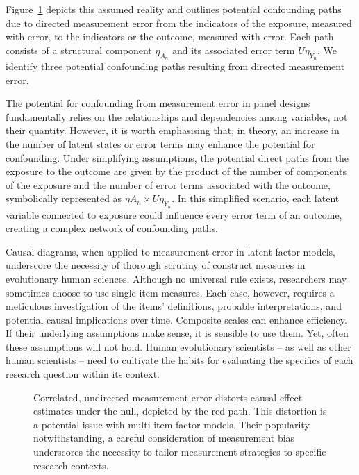 \documentclass[
  singlecolumn]{article}
\begin{document}
Figure~\ref{fig-dag-coarsen-measurement-error} depicts this assumed
reality and outlines potential confounding paths due to directed
measurement error from the indicators of the exposure, measured with
error, to the indicators or the outcome, measured with error. Each path
consists of a structural component \(\eta_{A_n}\) and its associated
error term \(U\eta_{Y_n}\). We identify three potential confounding
paths resulting from directed measurement error.

The potential for confounding from measurement error in panel designs
fundamentally relies on the relationships and dependencies among
variables, not their quantity. However, it is worth emphasising that, in
theory, an increase in the number of latent states or error terms may
enhance the potential for confounding. Under simplifying assumptions,
the potential direct paths from the exposure to the outcome are given by
the product of the number of components of the exposure and the number
of error terms associated with the outcome, symbolically represented as
\(\eta A_n \times U\eta_{Y_n}\). In this simplified scenario, each
latent variable connected to exposure could influence every error term
of an outcome, creating a complex network of confounding paths.

Causal diagrams, when applied to measurement error in latent factor
models, underscore the necessity of thorough scrutiny of construct
measures in evolutionary human sciences. Although no universal rule
exists, researchers may sometimes choose to use single-item measures.
Each case, however, requires a meticulous investigation of the items'
definitions, probable interpretations, and potential causal implications
over time. Composite scales can enhance efficiency. If their underlying
assumptions make sense, it is sensible to use them. Yet, often these
assumptions will not hold. Human evolutionary scientists -- as well as
other human scientists -- need to cultivate the habits for evaluating
the specifics of each research question within its context.

\begin{figure}


\caption{\label{fig-dag-coarsen-measurement-error}Correlated, undirected
measurement error distorts causal effect estimates under the null,
depicted by the red path. This distortion is a potential issue with
multi-item factor models. Their popularity notwithstanding, a careful
consideration of measurement bias underscores the necessity to tailor
measurement strategies to specific research contexts.}

\end{figure}%
\end{document}
